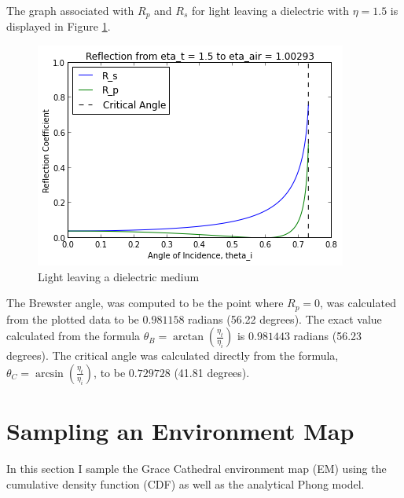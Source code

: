\documentclass[a4paper,12pt,oneside,final]{report}
\newenvironment{changemargin}[2]{\begin{list}{}{%
\setlength{\topsep}{0pt}%
\setlength{\leftmargin}{0pt}%
\setlength{\rightmargin}{0pt}%
\setlength{\listparindent}{\parindent}%
\setlength{\itemindent}{\parindent}%
\setlength{\parsep}{0pt plus 1pt}%
\addtolength{\leftmargin}{#1}%
\addtolength{\rightmargin}{#2}%
}\item }{\end{list}}
\begin{document}
The graph associated with $R_p$ and $R_s$ for light leaving a dielectric with $\eta = 1.5$ is displayed in Figure \ref{fig:fresnel2}.
\begin{figure}[!h]
  \begin{changemargin}{-50mm}{-50mm}
    \center
    \includegraphics[scale=0.8]{fresnel2.png}
    \caption{Light leaving a dielectric medium \label{fig:fresnel2}}
  \end{changemargin}
\end{figure}
The Brewster angle, was computed to be the point where $R_p = 0$, was calculated from the plotted data to be $0.981158$ radians (56.22 degrees).  The exact value calculated from the formula $\theta_B = \arctan\left(\frac{\eta_t}{\eta_i}\right)$ is $0.981443$ radians (56.23 degrees).  The critical angle was calculated directly from the formula, $\theta_C = \arcsin\left(\frac{\eta_t}{\eta_i}\right)$, to be $0.729728$ (41.81 degrees).

\chapter{Sampling an Environment Map}
In this section I sample the Grace Cathedral environment map (EM) using the cumulative density function (CDF) as well as the analytical Phong model.
\end{document}
